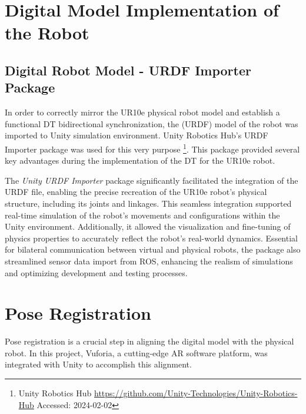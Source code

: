 


\section{Digital Model Implementation of the Robot}
\label{section:digital-model}

\subsection{Digital Robot Model - URDF Importer Package}
In order to correctly mirror the UR10e physical robot model and establish a functional \ac{DT} bidirectional synchronization, the (\ac{URDF}) model of the robot was imported to Unity simulation environment. Unity Robotics Hub's \ac{URDF} Importer package was used for this very purpose \footnote{Unity Robotics Hub \url{https://github.com/Unity-Technologies/Unity-Robotics-Hub} Accessed: 2024-02-02}.
This package provided several key advantages during the implementation of the \ac{DT} for the UR10e robot.

The \textit{Unity \ac{URDF} Importer} package significantly facilitated the integration of the \ac{URDF} file, enabling the precise recreation of the UR10e robot's physical structure, including its joints and linkages. This seamless integration supported real-time simulation of the robot's movements and configurations within the \ac{Unity} environment. Additionally, it allowed the visualization and fine-tuning of physics properties to accurately reflect the robot's real-world dynamics. Essential for bilateral communication between virtual and physical robots, the package also streamlined sensor data import from \ac{ROS}, enhancing the realism of simulations and optimizing development and testing processes.

\section{Pose Registration}
Pose registration is a crucial step in aligning the digital model with the physical robot. In this project, Vuforia, a cutting-edge \ac{AR} software platform, was integrated with Unity to accomplish this alignment.

